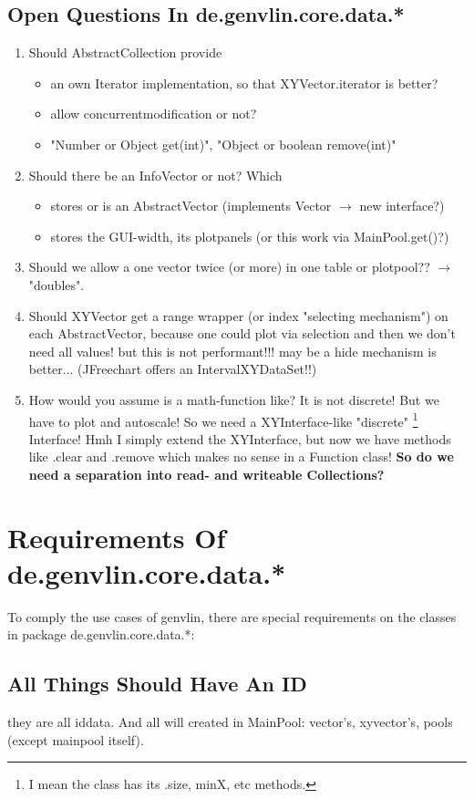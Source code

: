 \documentclass[12pt]{article}
\begin{document}
\subsection{Open Questions In de.genvlin.core.data.*}
\begin{enumerate}
\item Should AbstractCollection provide
\begin{itemize}
\item an own Iterator implementation, so that XYVector.iterator is better?
\item allow concurrentmodification or not?
\item "Number or Object get(int)", "Object or boolean remove(int)"    
\end{itemize}
\item Should there be an InfoVector or not? Which
\begin{itemize}
\item stores or is an AbstractVector (implements Vector $\rightarrow$ new interface?)
\item stores the GUI-width, its plotpanels (or this work via MainPool.get()?)
\end{itemize}
\item Should we allow a one vector twice (or more) in one table or plotpool?? $\rightarrow$ "doubles".
\item Should XYVector get a range wrapper (or index "selecting mechanism") on each AbstractVector, because one could plot via selection and then we don't need all values! but this is not performant!!! may be a hide mechanism is better...   (JFreechart offers an IntervalXYDataSet!!)
\item How would you assume is a math-function like? It is not discrete! But we have to plot and autoscale! So we need a XYInterface-like "discrete" \footnote{I mean the class has its .size, minX, etc methods.} Interface! Hmh I simply extend the XYInterface, but now we have methods like .clear and .remove which makes no sense in a Function class! {\bf So do we need a separation into read- and writeable Collections?}
\end{enumerate}
\section{Requirements Of de.genvlin.core.data.*}
To comply the use cases of genvlin, there are special requirements on the classes in package de.genvlin.core.data.*:
\subsection{All Things Should Have An ID}
they are all iddata. And all will created in MainPool: vector's, xyvector's, pools (except mainpool itself).
\end{document}
